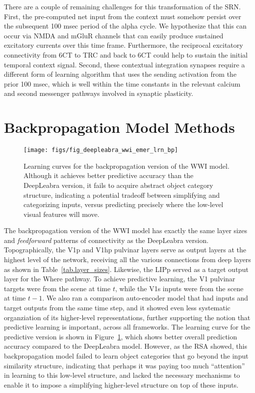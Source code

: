 \documentclass[12pt,twoside]{naturefigs}
\newif\myifpdf
\begin{document}
There are a couple of remaining challenges for this transformation of the SRN.  First, the pre-computed net input from the context must somehow persist over the subsequent 100 msec period of the alpha cycle.  We hypothesize that this can occur via NMDA and mGluR channels that can easily produce sustained excitatory currents over this time frame.  Furthermore, the reciprocal excitatory connectivity from 6CT to TRC and back to 6CT could help to sustain the initial temporal context signal.  Second, these contextual integration synapses require a different form of learning algorithm that uses the sending activation from the prior 100 msec, which is well within the time constants in the relevant calcium and second messenger pathways involved in synaptic plasticity.


\section{Backpropagation Model Methods}

\begin{figure}
  \centering\texttt{[image: figs/fig\_deepleabra\_wwi\_emer\_lrn\_bp]}
  \caption{Learning curves for the backpropagation version of the WWI model.  Although it achieves better predictive accuracy than the DeepLeabra version, it fails to acquire abstract object category structure, indicating a potential tradeoff between simplifying and categorizing inputs, versus predicting precisely where the low-level visual features will move.}
  \label{fig.bp_lrn}
\end{figure}

The backpropagation version of the WWI model has exactly the same layer sizes and {\em feedforward} patterns of connectivity as the DeepLeabra version.  Topographically, the V1p and V1hp pulvinar layers serve as output layers at the highest level of the network, receiving all the various connections from deep layers as shown in Table~\ref{tab.layer_sizes}.  Likewise, the LIPp served as a target output layer for the Where pathway.  To achieve predictive learning, the V1 pulvinar targets were from the scene at time $t$, while the V1s inputs were from the scene at time $t-1$.  We also ran a comparison auto-encoder model that had inputs and target outputs from the same time step, and it showed even less systematic organziation of its higher-level representations, further supporting the notion that predictive learning is important, across all frameworks.  The learning curve for the predictive version is shown in Figure~\ref{fig.bp_lrn}, which shows better overall prediction accuracy compared to the DeepLeabra model.  However, as the RSA showed, this backpropagation model failed to learn object categories that go beyond the input similarity structure, indicating that perhaps it was paying too much ``attention'' in learning to this low-level structure, and lacked the necessary mechanisms to enable it to impose a simplifying higher-level structure on top of these inputs.
\end{document}
